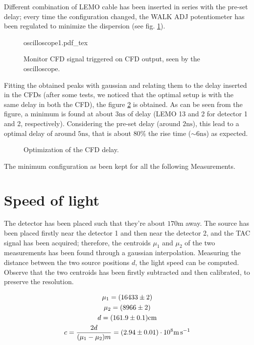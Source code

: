\documentclass[11pt,a4 paper]{article}
\let\oldfrac\frac
\renewcommand{\frac}[3][d]{\ifthenelse{\equal{#1}{d}}{\oldfrac{#2}{#3}}{\nicefrac{#2}{#3}}}
\begin{document}
Different combination of LEMO cable has been inserted in series with the pre-set delay; every time the configuration changed, the WALK ADJ potentiometer has been regulated to minimize the dispersion (see fig. \ref{fig:oscilloscope}).

\begin{figure}[H]
    \centering
    \def\svgwidth{0.7\textwidth}{oscilloscope1.pdf_tex}
    \caption{Monitor CFD signal triggered on CFD output, seen by the oscilloscope.}
    \label{fig:oscilloscope}
\end{figure}


Fitting the obtained peaks with gaussian and relating them to the delay inserted in the CFDs (after some tests, we noticed that the optimal setup is with the same delay in both the CFD), the figure \ref{fig:CFD:delay} is obtained. As can be seen from the figure, a minimum is found at about $3\si{\nano\second}$ of delay (LEMO 13 and 2 for detector 1 and 2, respectively). Considering the pre-set delay (around $2\si{\nano\second}$), this lead to a optimal delay of around $5\si{\nano\second}$, that is about $80\%$ the rise time ($\sim6\si{\nano\second}$) as expected.

\begin{figure}[H]
    \centering
    \caption{Optimization of the CFD delay.}
    \label{fig:CFD:delay}
\end{figure}

The minimum configuration as been kept for all the following Measurements.

\section{Speed of light}
The detector has been placed such that they're about $170\si{\metre}$ away. The source has been placed firstly near the detector 1 and then near the detector 2, and the TAC signal has been acquired; therefore, the centroids $\mu_1$ and $\mu_2$ of the two measurements has been found through a gaussian interpolation. Measuring the distance between the two source positions $d$, the light speed can be computed. Observe that the two centroids has been firstly subtracted and then calibrated, to preserve the resolution.

\begin{gather*}
    \mu_1 = (16433 \pm 2) \\
    \mu_2 = (8966 \pm 2) \\
    d = (161.9 \pm 0.1) \si{\centi\metre} \\
    c = \frac{2d}{(\mu_1-\mu_2)m} = (2.94 \pm 0.01 )\cdot 10^8 \si{\metre\per\second}
\end{gather*}
\end{document}
